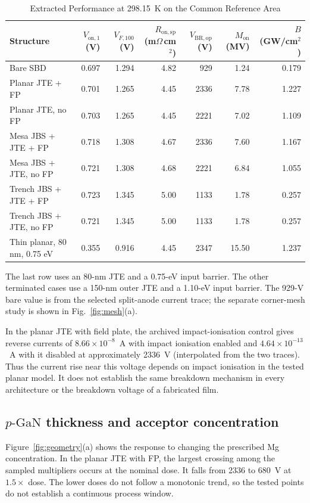 \documentclass[journal,10pt]{IEEEtran}
\newcommand{\pGaN}{\ensuremath{p\text{-}\mathrm{GaN}}}
\newcommand{\Vop}{\ensuremath{V_{\mathrm{BR,op}}}}
\newcommand{\Von}{\ensuremath{V_{\mathrm{on},1}}}
\newcommand{\Ron}{\ensuremath{R_{\mathrm{on,sp}}}}
\begin{document}
\begin{table}[!t]
\caption{Extracted Performance at 298.15~K on the Common Reference Area}
\label{tab:architectures}
\centering\footnotesize
\begin{tabular}{lrrrrrr}
\toprule
Structure & $\Von$ (V) & $V_{F,100}$ (V) & $\Ron$ (m$\Omega$\,cm$^2$) & $\Vop$ (V) & $M_{\mathrm{on}}$ (MV) & $B$ (GW/cm$^2$)\\
\midrule
Bare SBD & 0.697 & 1.294 & 4.82 & 929 & 1.24 & 0.179\\
Planar JTE + FP & 0.701 & 1.265 & 4.45 & 2336 & 7.78 & 1.227\\
Planar JTE, no FP & 0.703 & 1.265 & 4.45 & 2221 & 7.02 & 1.109\\
Mesa JBS + JTE + FP & 0.718 & 1.308 & 4.67 & 2336 & 7.60 & 1.167\\
Mesa JBS + JTE, no FP & 0.721 & 1.308 & 4.68 & 2221 & 6.84 & 1.055\\
Trench JBS + JTE + FP & 0.723 & 1.345 & 5.00 & 1133 & 1.78 & 0.257\\
Trench JBS + JTE, no FP & 0.721 & 1.345 & 5.00 & 1133 & 1.78 & 0.257\\
Thin planar, 80 nm, 0.75 eV & 0.355 & 0.916 & 4.45 & 2347 & 15.50 & 1.237\\
\bottomrule
\end{tabular}
\par\smallskip\begin{minipage}{0.96\textwidth}\footnotesize
The last row uses an 80-nm JTE and a 0.75-eV input barrier. The other terminated cases use a 150-nm outer JTE and a 1.10-eV input barrier. The 929-V bare value is from the selected split-anode current trace; the separate corner-mesh study is shown in Fig.~\ref{fig:mesh}(a).
\end{minipage}
\end{table}

In the planar JTE with field plate, the archived impact-ionisation control gives reverse currents of $8.66\times10^{-8}$~A with impact ionisation enabled and $4.64\times10^{-13}$~A with it disabled at approximately 2336~V (interpolated from the two traces). Thus the current rise near this voltage depends on impact ionisation in the tested planar model. It does not establish the same breakdown mechanism in every architecture or the breakdown voltage of a fabricated film.



\subsection{\pGaN{} thickness and acceptor concentration}
Figure~\ref{fig:geometry}(a) shows the response to changing the prescribed Mg concentration. In the planar JTE with FP, the largest crossing among the sampled multipliers occurs at the nominal dose. It falls from 2336 to 680~V at $1.5\times$ dose. The lower doses do not follow a monotonic trend, so the tested points do not establish a continuous process window.
\end{document}
